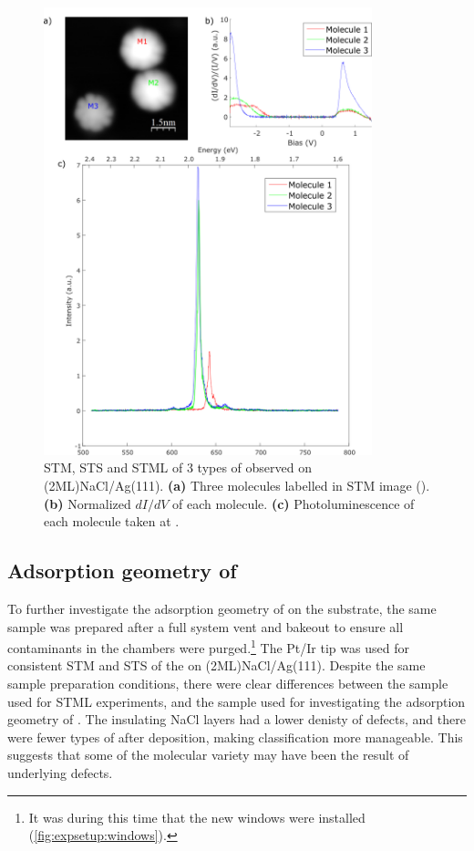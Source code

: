 \begin{figure} [H]
    \centering
        \includegraphics[width=0.85\textwidth]{pictures/3species_diagram.png}
        \caption{STM, STS and STML of 3 types of  observed on (2ML)NaCl/Ag(111). \textbf{(a)} Three molecules labelled in STM image (). \textbf{(b)} Normalized $dI/dV$ of each molecule. \textbf{(c)} Photoluminescence of each molecule taken at . }
    \label{fig:opv:f8znpc-sts_stml}
\end{figure}



\subsection{Adsorption geometry of }

To further investigate the adsorption geometry of  on the substrate, the same sample was prepared after a full system vent and bakeout to ensure all contaminants in the chambers were purged.\footnote{It was during this time that the new windows were installed (\autoref{fig:expsetup:windows}).} The Pt/Ir tip was used for consistent \ac{STM} and \ac{STS} of the  on (2ML)NaCl/Ag(111). Despite the same sample preparation conditions, there were clear differences between the sample used for \ac{STML} experiments, and the sample used for investigating the adsorption geometry of . The insulating NaCl layers had a lower denisty of defects, and there were fewer types of  after deposition, making classification more manageable. This suggests that some of the molecular variety may have been the result of underlying defects. 

